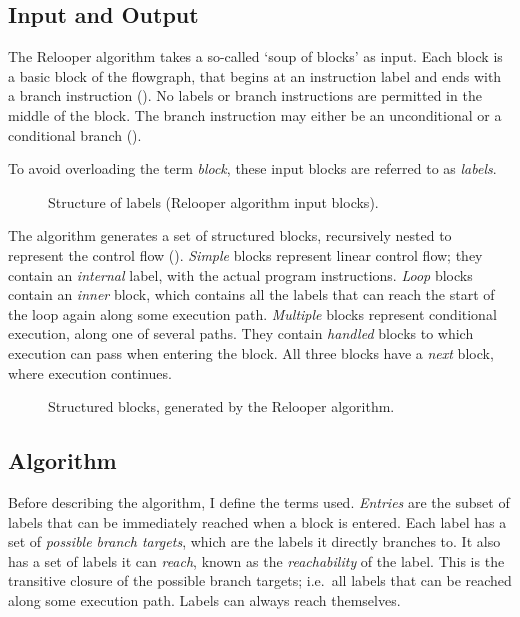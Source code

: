 \documentclass[00-main.tex]{subfiles}
\begin{document}
\subsection{Input and Output}

The Relooper algorithm takes a so-called `soup of blocks' as input.
Each block is a basic block of the flowgraph, that begins at an instruction label and ends with a branch instruction ().
No labels or branch instructions are permitted in the middle of the block.
The branch instruction may either be an unconditional or a conditional branch ().

To avoid overloading the term \emph{block}, these input blocks are referred to as \emph{labels}.


\begin{figure}[t]
  \addtolength{\belowcaptionskip}{\smallskipamount}
  \centering
  \caption{Structure of labels (Relooper algorithm input blocks).}
  \label{fig:relooper input label structure} %
\end{figure}

The algorithm generates a set of structured blocks, recursively nested to represent the control flow ().
\emph{Simple} blocks represent linear control flow; they contain an \emph{internal} label, with the actual program instructions.
\emph{Loop} blocks contain an \emph{inner} block, which contains all the labels that can reach the start of the loop again along some execution path.
\emph{Multiple} blocks represent conditional execution, along one of several paths.
They contain \emph{handled} blocks to which execution can pass when entering the block.
All three blocks have a \emph{next} block, where execution continues.

\begin{figure}[t]
  \centering
  \caption{Structured blocks, generated by the Relooper algorithm.}
  \label{fig:relooper output blocks structure} %
\end{figure}

\subsection{Algorithm}\label{sec:prep:relooper algorithm}

Before describing the algorithm, I define the terms used.
\emph{Entries} are the subset of labels that can be immediately reached when a block is entered.
Each label has a set of \emph{possible branch targets}, which are the labels it directly branches to.
It also has a set of labels it can \emph{reach}, known as the \emph{reachability} of the label.
This is the transitive closure of the possible branch targets; i.e.\ all labels that can be reached along some execution path.
Labels can always reach themselves.
\end{document}
